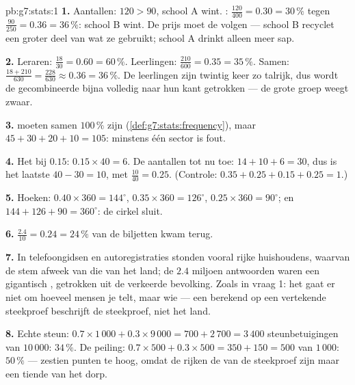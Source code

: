 \begin{solution}{pb:g7:stats:1}
\textbf{1.} Aantallen: $120 > 90$, school A wint. :
$\frac{120}{400} = 0.30 = 30\,\%$ tegen $\frac{90}{250} = 0.36 = 36\,\%$: school B
wint. De prijs moet de  volgen --- school B recyclet een groter deel van
wat ze gebruikt; school A drinkt alleen meer sap.

\textbf{2.} Leraren: $\frac{18}{30} = 0.60 = 60\,\%$. Leerlingen:
$\frac{210}{600} = 0.35 = 35\,\%$. Samen:
$\frac{18 + 210}{630} = \frac{228}{630} \approx 0.36 = 36\,\%$. De leerlingen zijn
twintig keer zo talrijk, dus wordt de gecombineerde  bijna volledig naar
hun kant getrokken --- de grote groep weegt zwaar.

\textbf{3.}  moeten samen $100\,\%$ zijn
(\cref{def:g7:stats:frequency}), maar $45 + 30 + 20 + 10 = 105$: minstens één
sector is fout.

\textbf{4.} Het  bij  $0.15$: $0.15 \times 40 = 6$. De aantallen tot
nu toe: $14 + 10 + 6 = 30$, dus is het laatste  $40 - 30 = 10$, met
 $\frac{10}{40} = 0.25$. (Controle:
$0.35 + 0.25 + 0.15 + 0.25 = 1$.)

\textbf{5.} Hoeken: $0.40 \times 360 = 144^\circ$, $0.35 \times 360 = 126^\circ$,
$0.25 \times 360 = 90^\circ$; en $144 + 126 + 90 = 360^\circ$: de cirkel sluit.

\textbf{6.} $\frac{2.4}{10} = 0.24 = 24\,\%$ van de biljetten kwam terug.

\textbf{7.} In telefoongidsen en autoregistraties stonden vooral rijke huishoudens,
waarvan de stem afweek van die van het land; de $2.4$ miljoen antwoorden waren een
gigantisch , getrokken uit de verkeerde bevolking. Zoals in vraag 1: het gaat
er niet om hoeveel mensen je telt, maar wie --- een  berekend op een
vertekende steekproef beschrijft de steekproef, niet het land.

\textbf{8.} Echte steun:
$0.7 \times 1\,000 + 0.3 \times 9\,000 = 700 + 2\,700 = 3\,400$ steunbetuigingen
van $10\,000$: $34\,\%$. De peiling:
$0.7 \times 500 + 0.3 \times 500 = 350 + 150 = 500$ van $1\,000$: $50\,\%$ ---
zestien punten te hoog, omdat de rijken de  van de steekproef zijn maar een
tiende van het dorp.


\end{solution}

